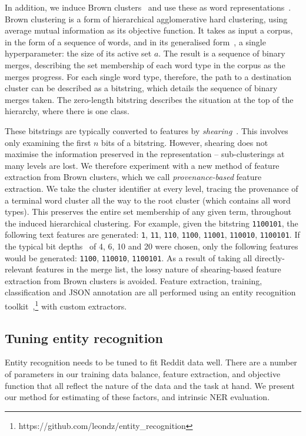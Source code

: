\documentclass[review]{elsarticle}
\begin{document}
In addition, we induce Brown clusters~\cite{brown1992class} and use these as word representations~\cite{turian2009preliminary}.
Brown clustering is a form of hierarchical agglomerative hard clustering, using average mutual information as its objective function.
It takes as input a corpus, in the form of a sequence of words, and in its generalised form~\cite{derczynski2016generalised}, a single hyperparameter: the size of its active set $a$.
The result is a sequence of binary merges, describing the set membership of each word type in the corpus as the merges progress.
For each single word type, therefore, the path to a destination cluster can be described as a bitstring, which details the sequence of binary merges taken.
The zero-length bitstring describes the situation at the top of the hierarchy, where there is one class.

These bitstrings are typically converted to features by \emph{shearing}~\cite{derczynski2016generalised}.
This involves only examining the first $n$ bits of a bitstring.
However, shearing does not maximise the information preserved in the representation -- sub-clusterings at many levels are lost.
We therefore experiment with a new method of feature extraction from Brown clusters, which we call {\em provenance-based} feature extraction.
We take the cluster identifier at every level, tracing the provenance of a terminal word cluster all the way to the root cluster (which contains all word types).
This preserves the entire set membership of any given term, throughout the induced hierarchical clustering.
For example, given the bitstring {\tt 1100101}, the following text features are generated: {\tt 1}, {\tt 11}, {\tt 110}, {\tt 1100}, {\tt 11001}, {\tt 110010}, {\tt 1100101}.
If the typical bit depths~\cite{ratinov2009design} of 4, 6, 10 and 20 were chosen, only the following features would be generated: {\tt 1100}, {\tt 110010}, {\tt 1100101}.
As a result of taking all directly-relevant features in the merge list, the lossy nature of shearing-based feature extraction from Brown clusters is avoided.
Feature extraction, training, classification and JSON annotation are all performed using an entity recognition toolkit~\cite{derczynski2015usfd},\footnote{https://github.com/leondz/entity\_recognition} with custom extractors.


\subsection{Tuning entity recognition}

Entity recognition needs to be tuned to fit Reddit data well.
There are a number of parameters in our training data balance, feature extraction, and objective function that all reflect the nature of the data and the task at hand.
We present our method for estimating of these factors, and intrinsic NER evaluation.
\end{document}

